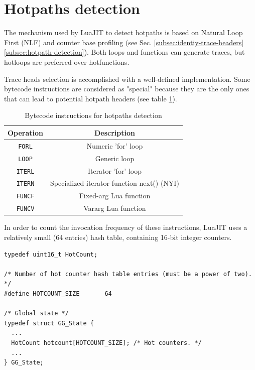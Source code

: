 \section{Hotpaths detection}

The mechanism used by LuaJIT to detect hotpaths is based on Natural Loop First (NLF) and counter base profiling (see Sec. \ref{subsec:identiy-trace-headers} \ref{subsec:hotpath-detection}). Both loops and functions can generate traces, but hotloops are preferred over hotfunctions.

 Trace heads selection is accomplished with a well-defined implementation. Some bytecode instructions are considered as "special" because they are the only ones that can lead to potential hotpath headers (see table \ref{tab:hotpath-headers}).

\begin{table}[H]
    \centering
    \begin{tabular}{|c|c|}
        \hline
        Operation & Description \\
        \hline
        \texttt{FORL} & Numeric 'for' loop\\
        \texttt{LOOP} & Generic loop\\
        \texttt{ITERL} & Iterator 'for' loop\\
        \texttt{ITERN} & Specialized iterator function next() (NYI)\\
        \texttt{FUNCF} & Fixed-arg Lua function\\
        \texttt{FUNCV} & Vararg Lua function\\
        \hline
    \end{tabular}
    \caption{Bytecode instructions for hotpaths detection}
    \label{tab:hotpath-headers}
\end{table}

\noindent
In order to count the invocation frequency of these instructions, LuaJIT uses a relatively small (64 entries) hash table, containing 16-bit integer counters.

\begin{lstlisting}[style=CStyle, caption=\texttt{lj\_dispatch.h}]
typedef uint16_t HotCount;

/* Number of hot counter hash table entries (must be a power of two). */
#define HOTCOUNT_SIZE		64

/* Global state */
typedef struct GG_State {
  ...
  HotCount hotcount[HOTCOUNT_SIZE];	/* Hot counters. */
  ... 
} GG_State;
\end{lstlisting}

